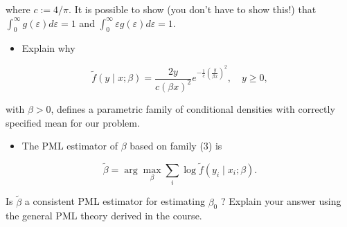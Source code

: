 where $c:=4 / \pi$. It is possible to show (you don't have to show this!) that $\int_{0}^{\infty} g(\varepsilon) d \varepsilon=1$ and $\int_{0}^{\infty} \varepsilon g(\varepsilon) d \varepsilon=1$.

\begin{itemize}
  \item Explain why
\end{itemize}


\begin{equation}
\tilde{f}(y \mid x ; \beta)=\frac{2 y}{c(\beta x)^{2}} e^{-\frac{1}{c}\left(\frac{y}{\beta x}\right)^{2}}, \quad y \geq 0, \label{eq:tilde}
\end{equation}


with $\beta>0$, defines a parametric family of conditional densities with correctly specified mean for our problem.

\begin{itemize}
  \item The PML estimator of $\beta$ based on family (3) is
\end{itemize}

$$
\tilde{\beta}=\arg \max _{\beta} \sum_{i} \log \tilde{f}\left(y_{i} \mid x_{i} ; \beta\right) .
$$

Is $\tilde{\beta}$ a consistent PML estimator for estimating $\beta_{0}$ ? Explain your answer using the general PML theory derived in the course.